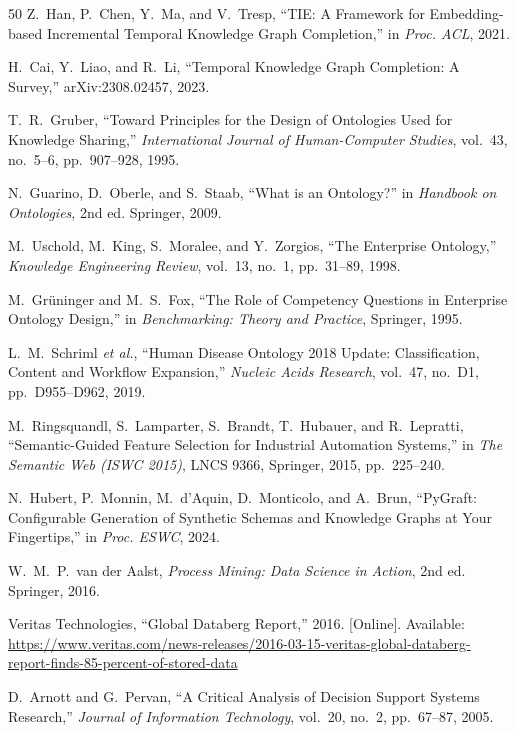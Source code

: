\documentclass{ieeeaccess}
\begin{document}
\begin{thebibliography}{50}
Z.~Han, P.~Chen, Y.~Ma, and V.~Tresp, ``TIE: A Framework for Embedding-based Incremental Temporal Knowledge Graph Completion,'' in \textit{Proc. ACL}, 2021.

H.~Cai, Y.~Liao, and R.~Li, ``Temporal Knowledge Graph Completion: A Survey,'' arXiv:2308.02457, 2023.

T.~R.~Gruber, ``Toward Principles for the Design of Ontologies Used for Knowledge Sharing,'' \textit{International Journal of Human-Computer Studies}, vol.~43, no.~5--6, pp.~907--928, 1995.

N.~Guarino, D.~Oberle, and S.~Staab, ``What is an Ontology?'' in \textit{Handbook on Ontologies}, 2nd ed. Springer, 2009.

M.~Uschold, M.~King, S.~Moralee, and Y.~Zorgios, ``The Enterprise Ontology,'' \textit{Knowledge Engineering Review}, vol.~13, no.~1, pp.~31--89, 1998.

M.~Gr\"{u}ninger and M.~S.~Fox, ``The Role of Competency Questions in Enterprise Ontology Design,'' in \textit{Benchmarking: Theory and Practice}, Springer, 1995.

L.~M.~Schriml \textit{et al.}, ``Human Disease Ontology 2018 Update: Classification, Content and Workflow Expansion,'' \textit{Nucleic Acids Research}, vol.~47, no.~D1, pp.~D955--D962, 2019.

M.~Ringsquandl, S.~Lamparter, S.~Brandt, T.~Hubauer, and R.~Lepratti, ``Semantic-Guided Feature Selection for Industrial Automation Systems,'' in \textit{The Semantic Web (ISWC 2015)}, LNCS 9366, Springer, 2015, pp.~225--240.

N.~Hubert, P.~Monnin, M.~d'Aquin, D.~Monticolo, and A.~Brun, ``PyGraft: Configurable Generation of Synthetic Schemas and Knowledge Graphs at Your Fingertips,'' in \textit{Proc. ESWC}, 2024.

W.~M.~P.~van der Aalst, \textit{Process Mining: Data Science in Action}, 2nd ed. Springer, 2016.

Veritas Technologies, ``Global Databerg Report,'' 2016. [Online]. Available: \url{https://www.veritas.com/news-releases/2016-03-15-veritas-global-databerg-report-finds-85-percent-of-stored-data}

D.~Arnott and G.~Pervan, ``A Critical Analysis of Decision Support Systems Research,'' \textit{Journal of Information Technology}, vol.~20, no.~2, pp.~67--87, 2005.


\end{thebibliography}
\end{document}
